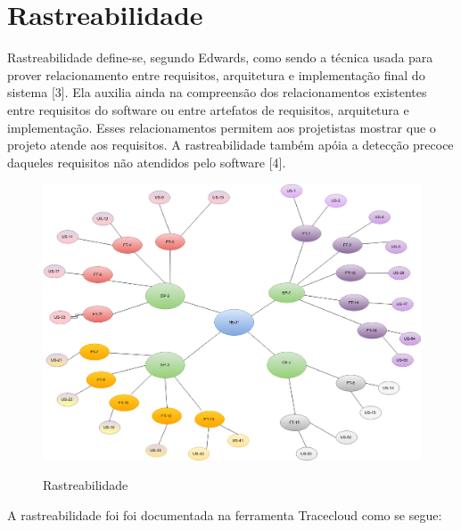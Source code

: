 \section{Rastreabilidade}

Rastreabilidade define-se, segundo Edwards, como sendo a técnica usada para prover relacionamento entre requisitos, arquitetura e implementação final do sistema [3]. Ela auxilia ainda na compreensão dos relacionamentos existentes entre requisitos do software ou entre artefatos de requisitos, arquitetura e implementação. Esses relacionamentos permitem aos projetistas mostrar que o projeto atende aos requisitos. A rastreabilidade também apóia a detecção precoce daqueles requisitos não atendidos pelo software [4].

\FloatBarrier
\begin{figure}[!htpd]
		\centering
		\includegraphics[scale=0.4]{figuras/Rastreabilidade}
		\label{img:rastreabilidade}
		\caption{Rastreabilidade}
\end{figure}
\FloatBarrier

A rastreabilidade foi foi documentada na ferramenta Tracecloud como se segue:

